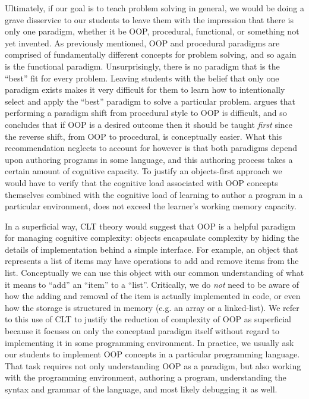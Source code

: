 \documentclass[12pt]{article}
\begin{document}
Ultimately, if our goal is to teach problem solving in general, we
would be doing a grave disservice to our students to leave them with
the impression that there is only one paradigm, whether it be OOP,
procedural, functional, or something not yet invented. As previously
mentioned, OOP and procedural paradigms are comprised of fundamentally
different concepts for problem solving, and so again is the functional
paradigm. Unsurprisingly, there is no paradigm that is the ``best''
fit for every problem. Leaving students with the belief that only one
paradigm exists makes it very difficult for them to learn how to
intentionally select and apply the ``best'' paradigm to solve a
particular problem. \citeauthor{kolling_problem_1999} argues that
performing a paradigm shift from procedural style to OOP is difficult,
and so concludes that if OOP is a desired outcome then it should be
taught \emph{first} since the reverse shift, from OOP to procedural,
is conceptually easier. What this recommendation neglects to account
for however is that both paradigms depend upon authoring programs in
some language, and this authoring process takes a certain amount of
cognitive capacity. To justify an objects-first approach we would have
to verify that the cognitive load associated with OOP concepts
themselves combined with the cognitive load of learning to author a
program in a particular environment, does not exceed the learner's
working memory capacity.

In a superficial way, CLT theory would suggest that OOP is a helpful
paradigm for managing cognitive complexity: objects encapsulate
complexity by hiding the details of implementation behind a simple
interface. For example, an object that represents a list of items may
have operations to add and remove items from the list. Conceptually we
can use this object with our common understanding of what it means to
``add'' an ``item'' to a ``list''. Critically, we do \emph{not} need
to be aware of how the adding and removal of the item is actually
implemented in code, or even how the storage is structured in memory
(e.g. an array or a linked-list). We refer to this use of CLT to
justify the reduction of complexity of OOP as superficial because it
focuses on only the conceptual paradigm itself without regard to
implementing it in some programming environment. In practice, we
usually ask our students to implement OOP concepts in a particular
programming language. That task requires not only understanding OOP as
a paradigm, but also working with the programming environment,
authoring a program, understanding the syntax and grammar of the
language, and most likely debugging it as well.
\end{document}
